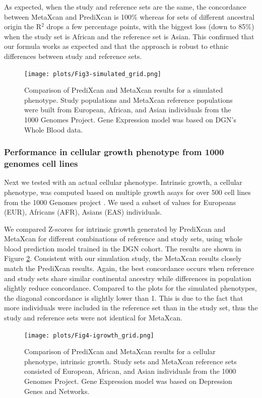 \documentclass[10pt]{article}
\begin{document}
As expected, when the study and reference sets are the same, the concordance between MetaXcan and PrediXcan is 100\% whereas for sets of different ancestral origin the R$^2$ drops a few percentage points, with the biggest loss (down to 85\%) when the study set is African and the reference set is Asian. This confirmed that our formula works as expected and that the approach is robust to ethnic differences between study and reference sets.

\begin{figure}
\texttt{[image: plots/Fig3-simulated\_grid.png]}
\caption{Comparison of PrediXcan and MetaXcan results for a simulated phenotype. 
Study populations and MetaXcan reference populations were built from European, African, and Asian
individuals from the 1000 Genomes Project. Gene Expression model was based on DGN's Whole Blood data.
}
\label{fig:simulatedgrid}
\end{figure}

\subsubsection*{Performance in cellular growth phenotype from 1000 genomes cell lines}

Next we tested with an actual cellular phenotype. Intrinsic growth, a cellular phenotype, was computed based on multiple growth asays for over 500 cell lines from the 1000 Genomes project \cite{Im2012}. We used a subset of values for Europeans (EUR), Africans (AFR), Asians (EAS) individuals.

We compared Z-scores for  intrinsic growth generated by PrediXcan and MetaXcan for different combinations of reference and study sets, using whole blood prediction model trained in the DGN cohort. The results are shown in Figure \ref{fig:igrowthgrid}. Consistent with our simulation study, the MetaXcan results closely match the PrediXcan results. Again, the best concordance occurs when reference and study sets share similar continental ancestry while differences in population slightly reduce concordance. Compared to the plots for the simulated phenotypes, the diagonal concordance is slightly lower than 1. This is due to the fact that more individuals were included in the reference set than in the study set, thus the study and reference sets were not identical for MetaXcan.

\begin{figure}
\texttt{[image: plots/Fig4-igrowth\_grid.png]}
\caption{Comparison of PrediXcan and MetaXcan results for a cellular phenotype, intrinsic growth. 
Study sets and MetaXcan reference sets consisted of European, African, and Asian
individuals from the 1000 Genomes Project. Gene Expression model was based on Depression Genes and Networks.}
\label{fig:igrowthgrid}
\end{figure}
\end{document}
